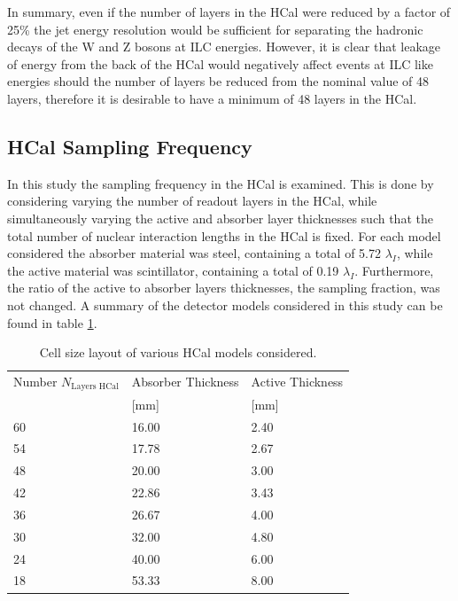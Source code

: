 In summary, even if the number of layers in the HCal were reduced by a factor of 25\% the jet energy resolution would be sufficient for separating the hadronic decays of the W and Z bosons at ILC energies.  However, it is clear that leakage of energy from the back of the HCal would negatively affect events at ILC like energies should the number of layers be reduced from the nominal value of 48 layers, therefore it is desirable to have a minimum of 48 layers in the HCal.
  

\subsection{HCal Sampling Frequency}
\label{sec:hcalsamplingfrequency}
In this study the sampling frequency in the HCal is examined.  This is done by considering varying the number of readout layers in the HCal, while simultaneously varying the active and absorber layer thicknesses such that the total number of nuclear interaction lengths in the HCal is fixed.  For each model considered the absorber material was steel, containing a total of 5.72 $\lambda_{I}$, while the active material was scintillator, containing a total of 0.19 $\lambda_{I}$.  Furthermore, the ratio of the active to absorber layers thicknesses, the sampling fraction, was not changed.  A summary of the detector models considered in this study can be found in table \ref{table:nlayershcaloption}.  

\begin{table}[h!]
\centering
\begin{tabular}{ l l l }
\hline
Number $N_{\text{Layers HCal}}$& Absorber Thickness & Active Thickness \\
 & [mm] & [mm] \\
\hline
60 & 16.00 & 2.40 \\ 
54 & 17.78 & 2.67 \\
48 & 20.00 & 3.00 \\
42 & 22.86 & 3.43 \\
36 & 26.67 & 4.00 \\
30 & 32.00 & 4.80 \\
24 & 40.00 & 6.00 \\
18 & 53.33 & 8.00 \\
\hline
\end{tabular}
\caption[Cell size layout of various HCal models considered.]{Cell size layout of various HCal models considered.}
\label{table:nlayershcaloption}
\end{table}

